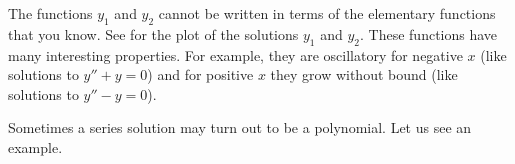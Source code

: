 \begin{example}
\begin{myfig}
\capstart
{}
\caption{The two solutions $y_1$ and $y_2$ to Airy's equation.\label{ps:airyfig}}
\end{myfig}
\end{example}
The functions $y_1$ and $y_2$ cannot be written in terms of the elementary
functions that you know.  See  for the plot of
the solutions $y_1$ and $y_2$.  These functions have many interesting
properties.  For example, they are oscillatory for negative $x$
(like solutions to $y''+y=0$) and
for positive $x$ they grow without bound (like solutions to $y''-y=0$).

\medskip

Sometimes a series solution may turn out to be a polynomial.
Let us see an example.

